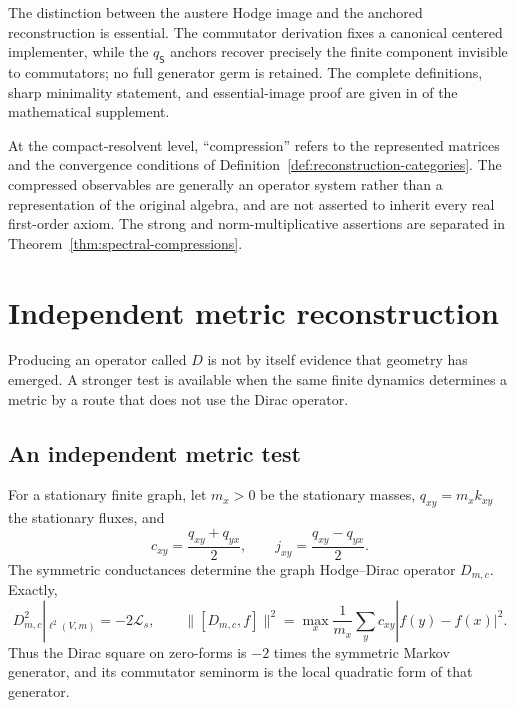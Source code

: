 \documentclass[11pt]{article}
\theoremstyle{definition}
\theoremstyle{remark}
\theoremstyle{definition}
\theoremstyle{remark}
\begin{document}
The distinction between the austere Hodge image and the anchored reconstruction is
essential.  The commutator derivation fixes a canonical centered implementer, while
the $q_{\mathsf S}$ anchors recover precisely the finite component invisible to
commutators; no full generator germ is retained.  The complete definitions, sharp
minimality statement, and essential-image proof are given in
 of the mathematical supplement.



At the compact-resolvent level, ``compression'' refers to the represented
matrices and the convergence conditions of
Definition~\ref{def:reconstruction-categories}.  The compressed observables are
generally an operator system rather than a representation of the original
algebra, and are not asserted to inherit every real first-order axiom.
The strong and norm-multiplicative assertions are separated in
Theorem~\ref{thm:spectral-compressions}.

\section{Independent metric reconstruction}
\label{sec:a3-main}

Producing an operator called $D$ is not by itself evidence that geometry has emerged.
A stronger test is available when the same finite dynamics determines a metric by a
route that does not use the Dirac operator.

\subsection{An independent metric test}

For a stationary finite graph, let $m_x>0$ be the stationary masses,
$q_{xy}=m_xk_{xy}$ the stationary fluxes, and
\begin{equation}
c_{xy}=\frac{q_{xy}+q_{yx}}2,
\qquad
j_{xy}=\frac{q_{xy}-q_{yx}}2.
\label{eq:summary-cj}
\end{equation}
The symmetric conductances determine the graph Hodge--Dirac operator $D_{m,c}$.
Exactly,
\begin{equation}
D_{m,c}^2|_{\ell^2(V,m)}=-2\mathcal L_s,
\qquad
\|[D_{m,c},f]\|^2
=\max_x\frac1{m_x}\sum_yc_{xy}|f(y)-f(x)|^2.
\label{eq:summary-graph-identities}
\end{equation}
Thus the Dirac square on zero-forms is $-2$ times the symmetric Markov generator, and its commutator seminorm
is the local quadratic form of that generator.
\end{document}
